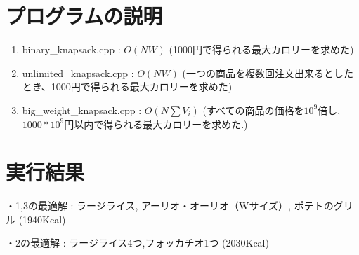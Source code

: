 \documentclass[a4paper,11pt]{jsarticle}
\begin{document}
\section{プログラムの説明}
\begin{enumerate}
  \item binary\_knapsack.cpp : $O(NW)$ (1000円で得られる最大カロリーを求めた)
  \item unlimited\_knapsack.cpp : $O(NW)$ (一つの商品を複数回注文出来るとしたとき、1000円で得られる最大カロリーを求めた)
  \item big\_weight\_knapsack.cpp : $O(N\sum{V_i})$ (すべての商品の価格を$10^9$倍し,$1000*10^9$円以内で得られる最大カロリーを求めた.)

\end{enumerate}

\section{実行結果}
・1,3の最適解 : ラージライス, アーリオ・オーリオ（Wサイズ）, ポテトのグリル (1940Kcal) \par
・2の最適解 : ラージライス4つ,フォッカチオ1つ (2030Kcal)
\end{document}

